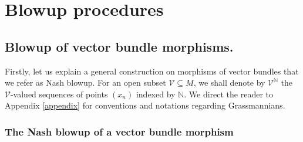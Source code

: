 \documentclass[10pt]{article}
\theoremstyle{plain}
\theoremstyle{definition}
\theoremstyle{remark}
\begin{document}
\section{Blowup procedures}\label{sec:2}


\subsection{Blowup of vector bundle morphisms.}



Firstly, let us explain a general construction on morphisms of vector bundles that we refer as Nash blowup. For an open subset $\mathcal V \subseteq M$, we shall denote by $\mathcal{V}^\mathbb N$ the $\mathcal V$-valued sequences of points $(x_n)$ indexed by $\mathbb{N}$. We direct the reader to Appendix \ref{appendix} for conventions and notations regarding Grassmannians.

\subsubsection{The Nash blowup of a vector bundle morphism}
\end{document}
